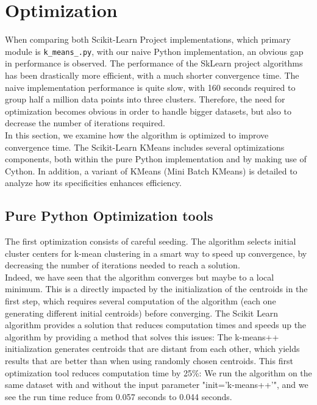 \documentclass[11pt]{article}
\begin{document}
\section*{Optimization}
When comparing both Scikit-Learn Project implementations, which primary module is \verb|k_means_.py|, with our naive Python implementation, an obvious gap in performance is observed. The performance of the SkLearn project algorithms has been drastically more efficient, with a much shorter convergence time.  The naive implementation performance is quite slow, with 160 seconds required to group half a million data points into three clusters. Therefore, the need for optimization becomes obvious in order to handle bigger datasets, but also to decrease the number of iterations required. \\

\noindent In this section, we examine how the algorithm is optimized to improve convergence time. The Scikit-Learn KMeans includes several optimizations components, both within the pure Python implementation and by making use of Cython. In addition, a variant of KMeans (Mini Batch KMeans) is detailed to analyze how its specificities enhances efficiency.  

\subsection*{Pure Python Optimization tools}
The first optimization consists of careful seeding. The algorithm selects initial cluster centers for k-mean clustering in a smart way to speed up convergence, by decreasing the number of iterations needed to reach a solution. \\

\noindent Indeed, we have seen that the algorithm converges but maybe to a local minimum. This is a directly impacted by the initialization of the centroids in the first step, which requires several computation of the algorithm (each one generating different initial centroids) before converging. The Scikit Learn algorithm provides a solution that reduces computation times and speeds up the algorithm by providing a method that solves this issues: The k-means++ initialization generates centroids that are distant from each other, which yields results that are better than when using randomly chosen centroids. This first optimization tool reduces computation time by 25\%: We run the algorithm on the same dataset with and without the input parameter "init='k-means++'", and we see the run time reduce from 0.057 seconds to 0.044 seconds. \\
\end{document}
